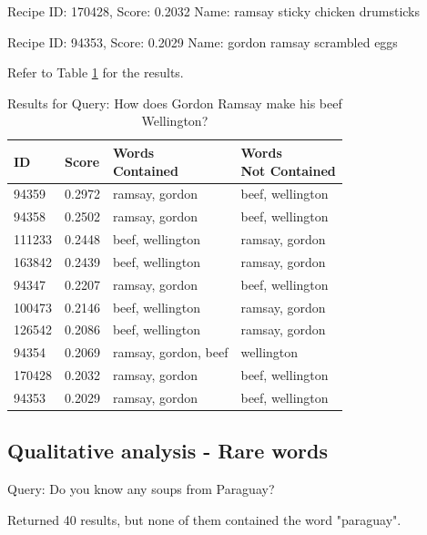 \documentclass[a4paper,11pt]{article}
\begin{document}
Recipe ID: 170428, Score: 0.2032
Name: ramsay sticky chicken drumsticks

Recipe ID: 94353, Score: 0.2029
Name: gordon ramsay scrambled eggs

Refer to Table \ref{tab:beef_wellington} for the results.

\begin{table}
    \centering
    \begin{tabular}{|l|l|l|l|}
        \hline
        \textbf{ID} & \textbf{Score} & \makecell{Words                         \\Contained} & \makecell{Words\\Not Contained} \\ \hline
        94359       & 0.2972         & ramsay, gordon       & beef, wellington \\ \hline
        94358       & 0.2502         & ramsay, gordon       & beef, wellington \\ \hline
        111233      & 0.2448         & beef, wellington     & ramsay, gordon   \\ \hline
        163842      & 0.2439         & beef, wellington     & ramsay, gordon   \\ \hline
        94347       & 0.2207         & ramsay, gordon       & beef, wellington \\ \hline
        100473      & 0.2146         & beef, wellington     & ramsay, gordon   \\ \hline
        126542      & 0.2086         & beef, wellington     & ramsay, gordon   \\ \hline
        94354       & 0.2069         & ramsay, gordon, beef & wellington       \\ \hline
        170428      & 0.2032         & ramsay, gordon       & beef, wellington \\ \hline
        94353       & 0.2029         & ramsay, gordon       & beef, wellington \\ \hline
    \end{tabular}
    \caption{Results for Query: How does Gordon Ramsay make his beef Wellington?}
    \label{tab:beef_wellington}
\end{table}


\subsection{Qualitative analysis - Rare words}
Query: Do you know any soups from Paraguay?

Returned 40 results, but none of them contained the word "paraguay".
\end{document}
